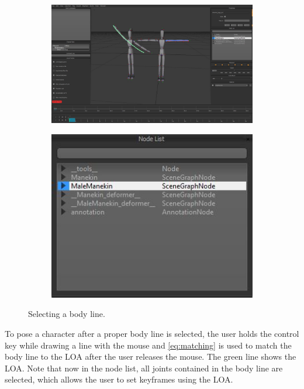 \begin{figure}[H]
	\centering
        \begin{subfigure}[b!]{0.45\textwidth}
        	\centering
                \includegraphics[width=\linewidth]{img/ui}
        \end{subfigure}
        \quad
        \begin{subfigure}[b!]{0.45\textwidth}
        	\centering
                \includegraphics[width=\linewidth]{img/ui2}
        \end{subfigure}%
        \caption{Selecting a body line.}
	\label{fig:selection}
\end{figure}

To pose a character after a proper body line is selected, the user holds the control key while drawing a line with the mouse and \autoref{eq:matching} is used to match the body line to the LOA after the user releases the mouse. The green line shows the LOA. Note that now in the node list, all joints contained in the body line are selected, which allows the user to set keyframes using the LOA.

